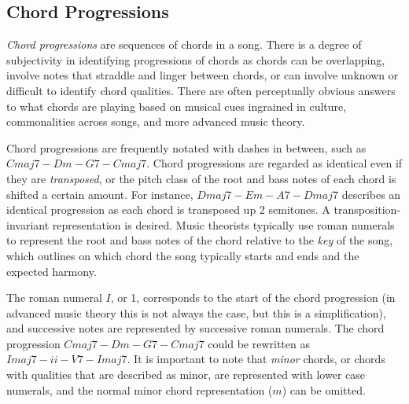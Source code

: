 \subsection{Chord Progressions}

\textit{Chord progressions} are sequences of chords in a song. There is a degree of subjectivity in identifying progressions of chords as chords can be overlapping, involve notes that straddle and linger between chords, or can involve unknown or difficult to identify chord qualities. There are often perceptually obvious answers to what chords are playing based on musical cues ingrained in culture, commonalities across songs, and more advanced music theory.

Chord progressions are frequently notated with dashes in between, such as $Cmaj7 - Dm - G7 - Cmaj7$. Chord progressions are regarded as identical even if they are \textit{transposed}, or the pitch class of the root and bass notes of each chord is shifted a certain amount. For instance, $Dmaj7 - Em - A7 - Dmaj7$ describes an identical progression as each chord is transposed up 2 semitones. A transposition-invariant representation is desired. Music theorists typically use roman numerals to represent the root and bass notes of the chord relative to the \textit{key} of the song, which outlines on which chord the song typically starts and ends and the expected harmony.

The roman numeral $I$, or 1, corresponds to the start of the chord progression (in advanced music theory this is not always the case, but this is a simplification), and successive notes are represented by successive roman numerals. The chord progression $Cmaj7 - Dm - G7 - Cmaj7$ could be rewritten as $Imaj7 - ii - V7 - Imaj7$. It is important to note that \textit{minor} chords, or chords with qualities that are described as minor, are represented with lower case numerals, and the normal minor chord representation ($m$) can be omitted.